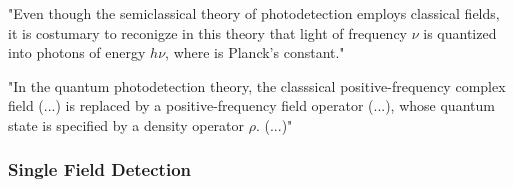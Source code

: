 \begin{bibunit}[plain]
"Even though the semiclassical theory of photodetection employs classical fields, it is costumary to reconigze in this theory that light of frequency $\nu$ is quantized into photons of energy $h \nu$, where is Planck's constant."\\
\cite{shapiro1985quantum} %

"In the quantum photodetection theory, the classsical positive-frequency complex field (...) is replaced by a positive-frequency field operator (...), whose quantum state is specified by a density operator $\rho$. (...)"\\
\cite{shapiro1985quantum} %



\subsubsection{Single Field Detection}


\end{bibunit}
